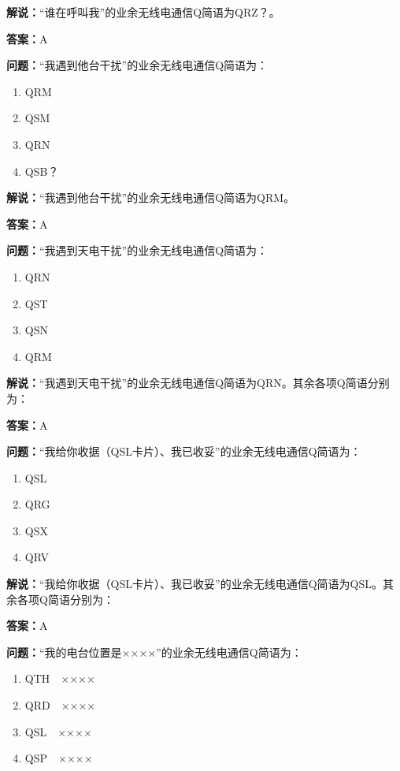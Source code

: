 \textbf{解说：}“谁在呼叫我”的业余无线电通信Q简语为QRZ？。

\textbf{答案：}A

\textbf{问题：}“我遇到他台干扰”的业余无线电通信Q简语为：

\begin{enumerate}[label=\Alph*), leftmargin=1cm]
	\item QRM
	\item QSM
	\item QRN
	\item QSB？
\end{enumerate}

\textbf{解说：}“我遇到他台干扰”的业余无线电通信Q简语为QRM。

\textbf{答案：}A

\textbf{问题：}“我遇到天电干扰”的业余无线电通信Q简语为：

\begin{enumerate}[label=\Alph*), leftmargin=1cm]
	\item QRN
	\item QST
	\item QSN
	\item QRM
\end{enumerate}

\textbf{解说：}“我遇到天电干扰”的业余无线电通信Q简语为QRN。其余各项Q简语分别为：

\textbf{答案：}A

\textbf{问题：}“我给你收据（QSL卡片）、我已收妥”的业余无线电通信Q简语为：

\begin{enumerate}[label=\Alph*), leftmargin=1cm]
	\item QSL
	\item QRG
	\item QSX
	\item QRV
\end{enumerate}

\textbf{解说：}“我给你收据（QSL卡片）、我已收妥”的业余无线电通信Q简语为QSL。其余各项Q简语分别为：

\textbf{答案：}A

\textbf{问题：}“我的电台位置是××××”的业余无线电通信Q简语为：

\begin{enumerate}[label=\Alph*), leftmargin=1cm]
	\item QTH　××××
	\item QRD　××××
	\item QSL　××××
	\item QSP　××××
\end{enumerate}

